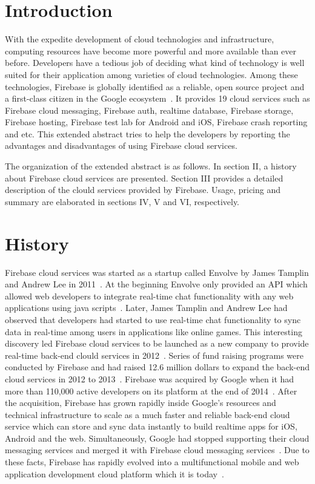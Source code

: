 \section{Introduction}

With the expedite development of cloud technologies and
infrastructure, computing resources have become more powerful and more
available than ever before.  Developers have a tedious job of deciding
what kind of technology is well suited for their application among
varieties of cloud technologies. Among these technologies, Firebase is
globally identified as a reliable, open source project and a
first-class citizen in the Google
ecosystem~\cite{hid-sp18-409-www-firebase}. It provides 19 cloud 
services such as Firebase cloud messaging, Firebase auth,
realtime database, Firebase storage, Firebase hosting, Firebase test
lab for Android and iOS, Firebase crash reporting and etc. This
extended abstract tries to help the developers by reporting the
advantages and disadvantages of using Firebase cloud services.

The organization of the extended abstract is as 
follows. In section II, a history about
Firebase cloud services are presented. Section III provides a detailed
description of the clould services provided by Firebase. Usage, pricing and
summary are elaborated in sections IV, V and VI, respectively.

\section{History}

Firebase cloud services was started as a startup called Envolve by James Tamplin
and Andrew Lee in 2011~\cite{hid-sp18-409-www-firebase-wikipedia}. At the
beginning Envolve only provided an API which allowed web developers to integrate
real-time chat functionality with any web applications using java
scripts~\cite{hid-sp18-409-www-firebase}. Later, James Tamplin and Andrew Lee
had observed that developers had started to use real-time chat functionality to
sync data in real-time among users in applications like online games. This
interesting discovery led Firebase cloud services to be launched as a new
company to provide real-time back-end clould services in
2012~\cite{hid-sp18-409-www-firebase-wikipedia}. Series of fund raising programs
were conducted by Firebase and had raised 12.6 million dollars to expand the
back-end cloud services in 2012 to 2013~\cite{hid-sp18-409-www-firebase}.
Firebase was acquired by Google when it had more than 110,000 active developers
on its platform  at the end of 2014~\cite{hid-sp18-409-www-firebase-acquired}.
After the acquisition, Firebase has grown rapidly inside Google's resources and
technical infrastructure to scale as a much faster and reliable back-end cloud
service which can store and sync data instantly to build realtime apps for iOS,
Android and the web. Simultaneously, Google had stopped supporting their cloud
messaging services and merged it with Firebase cloud messaging
services~\cite{hid-sp18-409-www-firebase-merged}. Due to these facts, Firebase
has rapidly evolved into a multifunctional mobile and web application
development cloud platform which it is
today~\cite{hid-sp18-409-www-firebase-official}.

